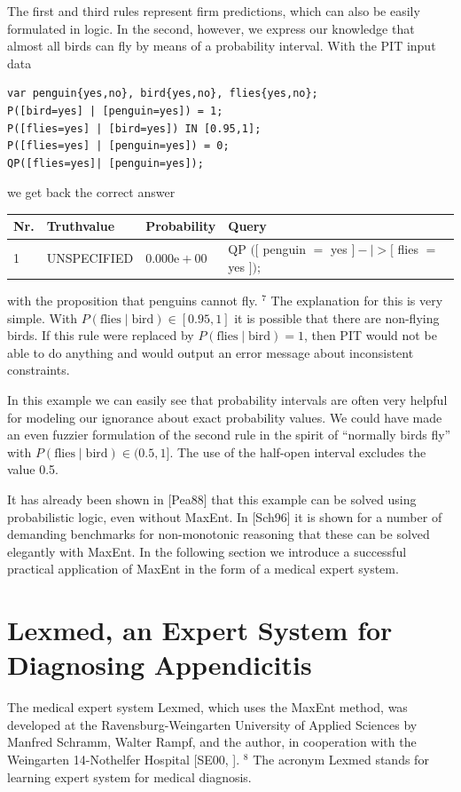 \documentclass[10pt]{book}
\begin{document}
The first and third rules represent firm predictions, which can also be easily formulated in logic. In the second, however, we express our knowledge that almost all birds can fly by means of a probability interval. With the PIT input data

\begin{verbatim}
var penguin{yes,no}, bird{yes,no}, flies{yes,no};
P([bird=yes] | [penguin=yes]) = 1;
P([flies=yes] | [bird=yes]) IN [0.95,1];
P([flies=yes] | [penguin=yes]) = 0;
QP([flies=yes]| [penguin=yes]);
\end{verbatim}

we get back the correct answer

\begin{center}
\begin{tabular}{llll}
\hline
Nr. & Truthvalue & Probability & Query \\
\hline
1 & UNSPECIFIED & $0.000 \mathrm{e}+00$ & QP $([$ penguin $=$ yes $]-\mid>[$ flies $=$ yes $]) ;$ \\
\hline
\end{tabular}
\end{center}

with the proposition that penguins cannot fly. ${ }^{7}$ The explanation for this is very simple. With $P(\text{flies} \mid \text{bird}) \in [0.95,1]$ it is possible that there are non-flying birds. If this rule were replaced by $P(\text{flies} \mid \text{bird})=1$, then PIT would not be able to do anything and would output an error message about inconsistent constraints.

In this example we can easily see that probability intervals are often very helpful for modeling our ignorance about exact probability values. We could have made an even fuzzier formulation of the second rule in the spirit of ``normally birds fly'' with $P(\text{flies} \mid \text{bird}) \in (0.5,1]$. The use of the half-open interval excludes the value 0.5.

It has already been shown in [Pea88] that this example can be solved using probabilistic logic, even without MaxEnt. In [Sch96] it is shown for a number of demanding benchmarks for non-monotonic reasoning that these can be solved elegantly with MaxEnt. In the following section we introduce a successful practical application of MaxEnt in the form of a medical expert system.

\section{Lexmed, an Expert System for Diagnosing Appendicitis}
The medical expert system Lexmed, which uses the MaxEnt method, was developed at the Ravensburg-Weingarten University of Applied Sciences by Manfred Schramm, Walter Rampf, and the author, in cooperation with the Weingarten 14-Nothelfer Hospital [SE00, \cite{lexmed1999}]. ${ }^{8}$ The acronym Lexmed stands for learning expert system for medical diagnosis.
\end{document}
